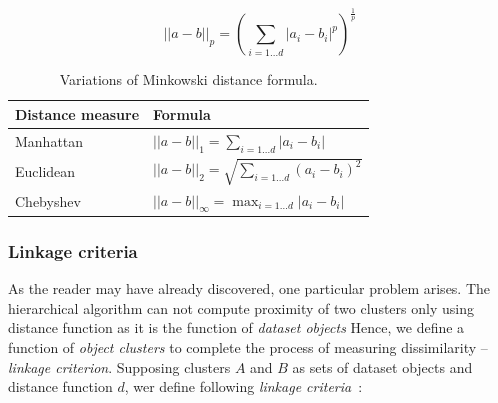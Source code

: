 \begin{equation}\label{eq01:mink}
||a-b||_p = (\sum_{i=1...d}|a_i-b_i|^p)^{\frac{1}{p}}
\end{equation}

\begin{table}
	\centering
	\begin{tabular}{ll}
		\toprule
		Distance measure & Formula \\
		\midrule
		Manhattan & $||a-b||_1 = \sum_{i=1...d}|a_i-b_i|$          \\
		Euclidean & $||a-b||_2 = \sqrt{\sum_{i=1...d}(a_i-b_i)^2}$ \\
		Chebyshev & $||a-b||_\infty = \max_{i=1\dots d}|a_i-b_i|$  \\ \bottomrule
	\end{tabular}
	\caption{Variations of Minkowski distance formula.}
	\label{tab01:mink}
\end{table}

\subsubsection{Linkage criteria}

As the reader may have already discovered, one particular problem arises. The hierarchical algorithm can not compute proximity of two clusters only using distance function as it is the function of \emph{dataset objects} Hence, we define a function of \emph{object clusters} to complete the process of measuring dissimilarity -- \emph{linkage criterion}. Supposing clusters $A$ and $B$ as sets of dataset objects and distance function $d$, wer define following \emph{linkage criteria}~\cite{yim2015hierarchical}:

